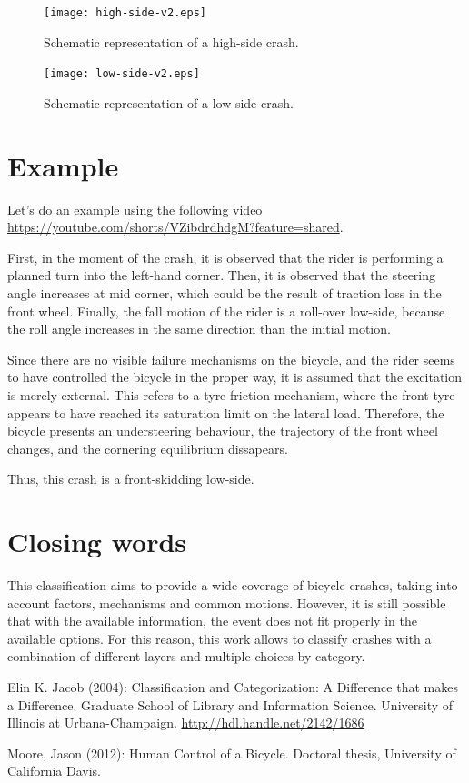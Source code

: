 \documentclass{article}
\begin{document}
\begin{figure}
    \centering
    \texttt{[image: high-side-v2.eps]}
    \caption{Schematic representation of a high-side crash.}
    \label{fig: highside}
\end{figure}

\begin{figure}
    \centering
    \texttt{[image: low-side-v2.eps]}
    \caption{Schematic representation of a low-side crash.}
    \label{fig: lowside}
\end{figure}

\section{Example}

Let's do an example using the following video \url{https://youtube.com/shorts/VZibdrdhdgM?feature=shared}.


First, in the moment of the crash, it is observed that the rider is performing a planned turn into the left-hand corner.
%
Then, it is observed that the steering angle increases at mid corner, which could be the result of traction loss in the front wheel.
%
Finally, the fall motion of the rider is a roll-over low-side, because the roll angle increases in the same direction than the initial motion.


Since there are no visible failure mechanisms on the bicycle, and the rider seems to have controlled the bicycle in the proper way, it is assumed that the excitation is merely external.
%
This refers to a tyre friction mechanism, where the front tyre appears to have reached its saturation limit on the lateral load.
%
Therefore, the bicycle presents an understeering behaviour, the trajectory of the front wheel changes, and the cornering equilibrium dissapears.


Thus, this crash is a front-skidding low-side.



\section{Closing words}

This classification aims to provide a wide coverage of bicycle crashes, taking into account factors, mechanisms and common motions.
%
However, it is still possible that with the available information, the event does not fit properly in the available options.
%
For this reason, this work allows to classify crashes with a combination of different layers and multiple choices by category.



\begin{thebibliography}{9}

     Elin K. Jacob (2004):  Classification and Categorization: A Difference that makes a Difference. Graduate School of Library and Information Science. University of Illinois at Urbana-Champaign. \url{http://hdl.handle.net/2142/1686}

     Moore, Jason (2012): Human Control of a Bicycle. Doctoral thesis, University of California Davis.


\end{thebibliography}
\end{document}
